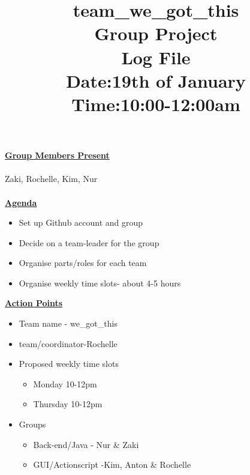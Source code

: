 \documentclass{article}
\begin{document}
	\title{team\_we\_got\_this\\ Group Project \\ Log File\\Date:19th of January\\Time:10:00-12:00am}
	
	\maketitle


	{\bf\underline{Group Members Present}}\\\\
	Zaki, Rochelle, Kim, Nur\\\\

	

	{\bf\underline{Agenda}}\\
	
		\begin{itemize}
			\item{Set up Github account and group}
			\item{Decide on a team-leader for the group}
			\item{Organise parts/roles for each team}
			\item Organise weekly time slots- about 4-5 hours
		\end{itemize}
	
	
	
	\underline{\bf{Action Points}}\\
	\begin{itemize}
		\item Team name - we\_got\_this
		\item team/coordinator-Rochelle 
		\item Proposed weekly time slots
			\begin{itemize}
				\item Monday 10-12pm 
				\item Thursday 10-12pm
			\end{itemize} 
		\item Groups
			\begin{itemize}
				\item Back-end/Java - Nur \& Zaki
				\item GUI/Actionscript -Kim, Anton \& Rochelle 
			\end{itemize}
	\end{itemize}
	\newpage
	
	
	
\end{document}
